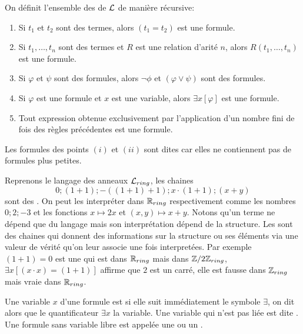 \begin{defi}[Formule]\label{termeformule}
On définit l'ensemble des  de $\mathcal{L}$ de manière récursive:
\begin{enumerate}[label= (\roman*)]
    \item Si $t_1$ et $t_2$ sont des termes, alors $(t_1 = t_2)$ est une formule.
    \item Si $t_1, \ldots, t_n$ sont des termes et $R$ est une relation d'arité
    $n$, alors $R(t_1,\ldots,t_n)$ est une formule.
    \item Si $\varphi$ et $\psi$ sont des formules, alors $\neg \phi$ et
    $(\varphi \vee \psi)$ sont des formules.
    \item Si $\varphi$ est une formule et $x$ est une variable, alors $\exists x [\varphi]$ est une formule.
    \item Tout expression obtenue exclusivement par l'application d'un nombre
    fini de fois des règles précédentes est une formule.
\end{enumerate}
Les formules des points $(i)$ et $(ii)$ sont dites  car elles
ne contiennent pas de formules plus petites.
\end{defi}

\begin{exem}
Reprenons le langage des anneaux $\mathcal{L}_{ring}$, les chaines \[ 0;
(1+1); -((1+1)+1); x\cdot(1+1); (x+y) \] sont des .
On peut les interpréter dans $\mathbb{R}_{ring}$ respectivement comme les nombres
$0;2;-3$ et les fonctions $x \mapsto 2x$ et $(x,y) \mapsto x+y$.
Notons qu'un terme ne dépend que du langage mais son interprétation dépend de la structure.
Les  sont des chaines qui donnent des informations sur la structure ou
ses éléments via une valeur de vérité qu'on leur associe une fois interpretées.
Par exemple $(1+1) = 0$ est une  qui  est  dans $\mathbb{R}_{ring}$
mais  dans $\mathbb{Z}/{2\mathbb{Z}}_{ring}$, $\exists x [(x\cdot x) = (1+1)]$ affirme que
$2$ est un carré, elle est fausse dans $\mathbb{Z}_{ring}$ mais vraie dans $\mathbb{R}_{ring}$.
\end{exem}

\begin{defi}
Une variable $x$ d'une formule est  si elle suit immédiatement le
symbole $\exists$, on dit alors que le quantificateur $\exists x$  la
variable. Une variable qui n'est pas liée est dite .
Une formule sans variable libre est appelée une  ou un .
\end{defi}

